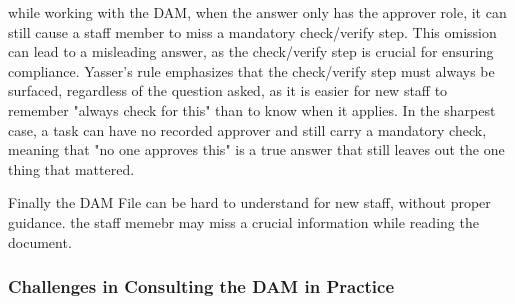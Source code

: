 while working with the DAM, when the answer only has the approver role, it can still cause a staff member to miss a mandatory check/verify step. This omission can lead to a misleading answer, as the check/verify step is crucial for ensuring compliance. Yasser's rule emphasizes that the check/verify step must always be surfaced, regardless of the question asked, as it is easier for new staff to remember "always check for this" than to know when it applies. In the sharpest case, a task can have no recorded approver and still carry a mandatory check, meaning that "no one approves this" is a true answer that still leaves out the one thing that mattered.

Finally the DAM File can be hard to understand for new staff, without proper guidance. the staff memebr may miss a crucial information while reading the document.
\subsubsection{Challenges in Consulting the DAM in Practice}

